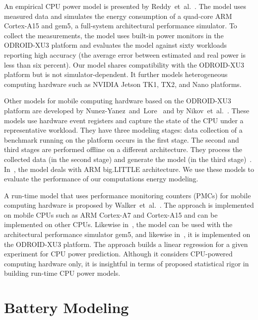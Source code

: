 An empirical CPU power model is presented by Reddy~et~al.~\citep{reddy2017empirical}. The model uses measured data and simulates the energy consumption of a quad-core ARM Cortex-A15 and gem5, a full-system architectural performance simulator. To collect the measurements, the model uses built-in power monitors in the ODROID-XU3 platform and evaluates the model against sixty workloads reporting high accuracy (the average error between estimated and real power is less than six percent). Our model shares compatibility with the ODROID-XU3 platform but is not simulator-dependent. It further models heterogeneous computing hardware such as NVIDIA Jetson TK1, TX2, and Nano platforms. 
 
Other models for mobile computing hardware based on the ODROID-XU3 platform are developed by Nunez-Yanez~and~Lore~\citep{nunez2013enabling} and by Nikov~et~al.~\citep{nikov2015evaluation}. These models use hardware event registers and capture the state of the CPU under a representative workload. They have three modeling stages: data collection of a benchmark running on the platform occurs in the first stage. The second and third stages are performed offline on a different architecture. They process the collected data (in the second stage) and generate the model (in the third stage)~\citep{seewald2019coarse}. In~\citep{nikov2015evaluation}, the model deals with ARM big.LITTLE architecture. We use these models to evaluate the performance of our computations energy modeling.

A run-time model that uses performance monitoring counters (PMCs) for mobile computing hardware is proposed by Walker~et~al.~\citep{walker2017accurate}. The approach is implemented on mobile CPUs such as ARM Cortex-A7 and Cortex-A15 and can be implemented on other CPUs. Likewise in~\citep{reddy2017empirical}, the model can be used with the architectural performance simulator gem5, and likewise in~\citep{nunez2013enabling,nikov2015evaluation,reddy2017empirical}, it is implemented on the ODROID-XU3 platform. The approach builds a linear regression for a given experiment for CPU power prediction. Although it considers CPU-powered computing hardware only, it is insightful in terms of proposed statistical rigor in building run-time CPU power models.


\section{Battery Modeling}
\label{sec:soa-ene-bat}

